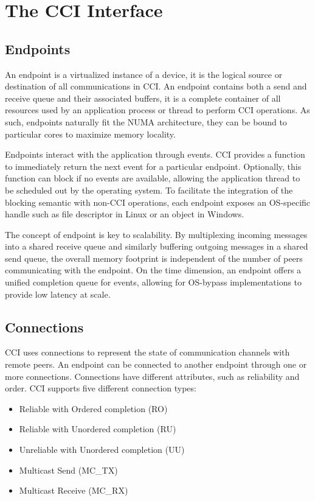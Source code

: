 \section{The CCI Interface}

\subsection{Endpoints}
An endpoint is a virtualized instance of a device, it is the logical source 
or destination of all communications in CCI. An endpoint contains both a send 
and receive queue and their associated buffers, it is a complete container 
of all resources used by an application process or thread to perform CCI 
operations. As such, endpoints naturally fit the NUMA architecture, they can 
be bound to particular cores to maximize memory locality.

Endpoints interact with the application through events. CCI provides a 
function to immediately return the next event for a particular endpoint. 
Optionally, this function can block if no events are available, allowing the 
application thread to be scheduled out by the operating system. To facilitate 
the integration of the blocking semantic with non-CCI operations, each endpoint 
exposes an OS-specific handle such as file descriptor in Linux or an object in 
Windows.

The concept of endpoint is key to scalability. By multiplexing incoming 
messages into a shared receive queue and similarly buffering outgoing 
messages in a shared send queue, the overall memory footprint is independent 
of the number of peers communicating with the endpoint. On the time dimension, 
an endpoint offers a unified completion queue for events, allowing for 
OS-bypass implementations to provide low latency at scale.

\subsection{Connections}
CCI uses connections to represent the state of communication channels with 
remote peers. An endpoint can be connected to another endpoint through one or 
more connections. Connections have different attributes, such as 
reliability and order. CCI supports five different connection types:

\begin{itemize}
\item Reliable with Ordered completion (RO)
\item Reliable with Unordered completion (RU)
\item Unreliable with Unordered completion (UU)
\item Multicast Send (MC\_TX)
\item Multicast Receive (MC\_RX)
\end{itemize}

